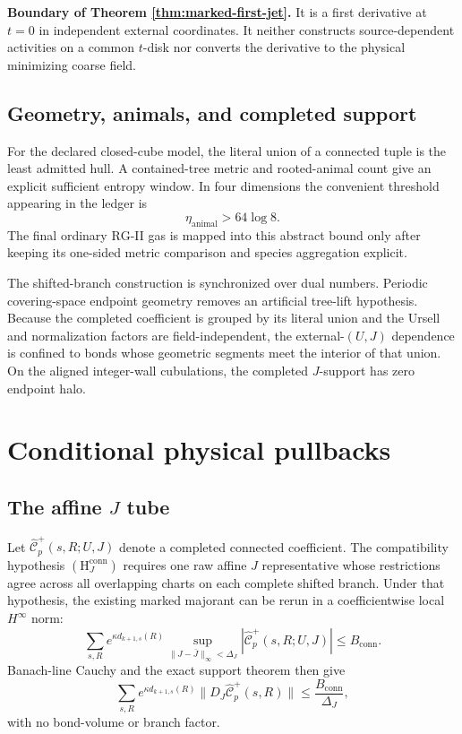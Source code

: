 \documentclass[11pt]{article}
\theoremstyle{definition}
\newcommand{\RG}{\mathrm{RG}}
\newcommand{\HJ}{(\mathrm H_J^{\mathrm{conn}})}
\begin{document}
\textbf{Boundary of Theorem \ref{thm:marked-first-jet}.}
It is a first derivative at \(t=0\) in independent external coordinates.
It neither constructs source-dependent activities on a common \(t\)-disk
nor converts the derivative to the physical minimizing coarse field.

\subsection{Geometry, animals, and completed support}

For the declared closed-cube model, the literal union of a connected tuple
is the least admitted hull.  A contained-tree metric and rooted-animal count
give an explicit sufficient entropy window.  In four dimensions the
convenient threshold appearing in the ledger is
\[
\eta_{\mathrm{animal}}>64\log 8.
\tag{3.3}
\]
The final ordinary \(\RG\)-II gas is mapped into this abstract bound only
after keeping its one-sided metric comparison and species aggregation
explicit.

The shifted-branch construction is synchronized over dual numbers.
Periodic covering-space endpoint geometry removes an artificial tree-lift
hypothesis.  Because the completed coefficient is grouped by its literal
union and the Ursell and normalization factors are field-independent, the
external-\((U,J)\) dependence is confined to bonds whose geometric segments
meet the interior of that union.  On the aligned integer-wall cubulations,
the completed \(J\)-support has zero endpoint halo.

\section{Conditional physical pullbacks}

\subsection{The affine \(J\) tube}

Let \(\widehat{\mathcal C}_p^+(s,R;U,J)\) denote a completed connected
coefficient.  The compatibility hypothesis \(\HJ\) requires one raw affine
\(J\) representative whose restrictions agree across all overlapping
charts on each complete shifted branch.  Under that hypothesis, the
existing marked majorant can be rerun in a coefficientwise local
\(H^\infty\) norm:
\[
\sum_{s,R} e^{\kappa d_{k+1,s}(R)}
\sup_{\|J-\bar J\|_\infty<\Delta_J}
|\widehat{\mathcal C}_p^+(s,R;U,J)|
\le B_{\mathrm{conn}}.
\tag{4.1}
\]
Banach-line Cauchy and the exact support theorem then give
\[
\sum_{s,R} e^{\kappa d_{k+1,s}(R)}
\|D_J\widehat{\mathcal C}_p^+(s,R)\|
\le \frac{B_{\mathrm{conn}}}{\Delta_J},
\tag{4.2}
\]
with no bond-volume or branch factor.
\end{document}
